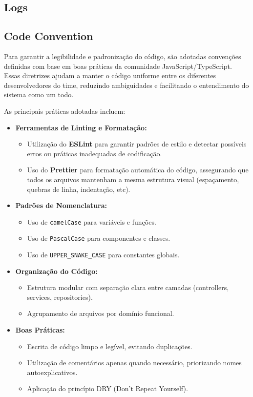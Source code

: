 \subsection{Logs}
\subsection{Code Convention}
Para garantir a legibilidade e padronização do código, são adotadas convenções definidas com base em boas práticas da comunidade JavaScript/TypeScript.
Essas diretrizes ajudam a manter o código uniforme entre os diferentes desenvolvedores do time, reduzindo ambiguidades e facilitando o entendimento do sistema como um todo.


As principais práticas adotadas incluem:

\begin{itemize}
  \item \textbf{Ferramentas de Linting e Formatação:}
  \begin{itemize}
    \item Utilização do \textbf{ESLint} para garantir padrões de estilo e detectar possíveis erros ou práticas inadequadas de codificação.
    \item Uso do \textbf{Prettier} para formatação automática do código, assegurando que todos os arquivos mantenham a mesma estrutura visual (espaçamento, quebras de linha, indentação, etc).
  \end{itemize}

  \item \textbf{Padrões de Nomenclatura:}
  \begin{itemize}
    \item Uso de \texttt{camelCase} para variáveis e funções.
    \item Uso de \texttt{PascalCase} para componentes e classes.
    \item Uso de \texttt{UPPER\_SNAKE\_CASE} para constantes globais.
  \end{itemize}

  \item \textbf{Organização do Código:}
  \begin{itemize}
    \item Estrutura modular com separação clara entre camadas (controllers, services, repositories).
    \item Agrupamento de arquivos por domínio funcional.
  \end{itemize}

  \item \textbf{Boas Práticas:}
  \begin{itemize}
    \item Escrita de código limpo e legível, evitando duplicações.
    \item Utilização de comentários apenas quando necessário, priorizando nomes autoexplicativos.
    \item Aplicação do princípio DRY (Don't Repeat Yourself).
  \end{itemize}


\end{itemize}
